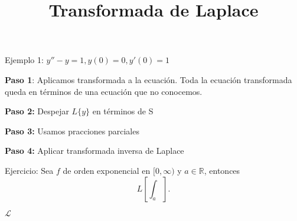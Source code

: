 \documentclass{article}
\title{Transformada de Laplace}
\begin{document}
\maketitle

Ejemplo 1: $y''-y=1, y(0)=0, y'(0)=1$

\textbf{Paso 1}: Aplicamos transformada a la ecuación.
Toda la ecuación transformada queda en términos de una ecuación que no conocemos. 

\textbf{Paso 2:} Despejar $L\{y\}$ en términos de S

\textbf{Paso 3:} Usamos pracciones parciales

\textbf{Paso 4:} Aplicar transformada inversa de Laplace

Ejercicio: 
Sea $f$ de orden exponencial en  $[0,\infty)$ y $a\in \mathbb{R}$, entonces \[
    L[\int_a^{}]
.\] 

$\mathcal{L}$
\end{document}
